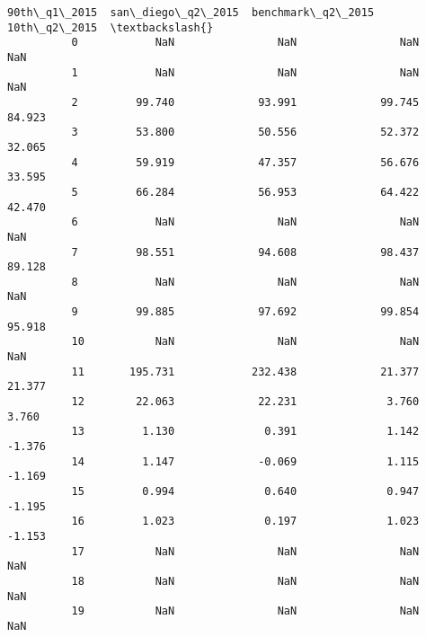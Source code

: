 \documentclass[11pt]{article}
\begin{document}
\begin{Verbatim}[commandchars=\\\{\}]
              90th\_q1\_2015  san\_diego\_q2\_2015  benchmark\_q2\_2015  10th\_q2\_2015  \textbackslash{}
          0            NaN                NaN                NaN           NaN   
          1            NaN                NaN                NaN           NaN   
          2         99.740             93.991             99.745        84.923   
          3         53.800             50.556             52.372        32.065   
          4         59.919             47.357             56.676        33.595   
          5         66.284             56.953             64.422        42.470   
          6            NaN                NaN                NaN           NaN   
          7         98.551             94.608             98.437        89.128   
          8            NaN                NaN                NaN           NaN   
          9         99.885             97.692             99.854        95.918   
          10           NaN                NaN                NaN           NaN   
          11       195.731            232.438             21.377        21.377   
          12        22.063             22.231              3.760         3.760   
          13         1.130              0.391              1.142        -1.376   
          14         1.147             -0.069              1.115        -1.169   
          15         0.994              0.640              0.947        -1.195   
          16         1.023              0.197              1.023        -1.153   
          17           NaN                NaN                NaN           NaN   
          18           NaN                NaN                NaN           NaN   
          19           NaN                NaN                NaN           NaN   
          

\end{Verbatim}
\end{document}

